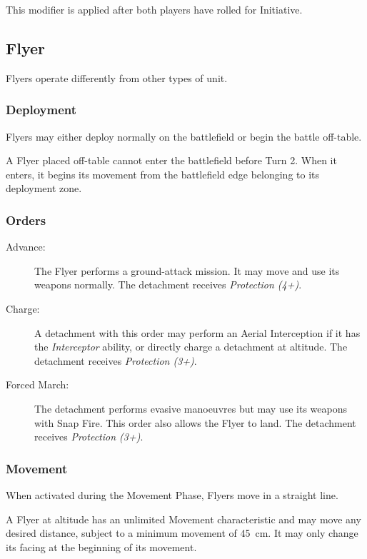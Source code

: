 This modifier is applied after both players have rolled for Initiative.

\subsection{Flyer}

Flyers operate differently from other types of unit.

\subsubsection{Deployment}

Flyers may either deploy normally on the battlefield or begin the battle off-table.

A Flyer placed off-table cannot enter the battlefield before Turn 2. When it enters, it begins its movement from the battlefield edge belonging to its deployment zone.

\subsubsection{Orders}

\begin{description}
    \item[Advance:] The Flyer performs a ground-attack mission. It may move and use its weapons normally. The detachment receives \textit{Protection (4+)}.

    \item[Charge:] A detachment with this order may perform an Aerial Interception if it has the \textit{Interceptor} ability, or directly charge a detachment at altitude. The detachment receives \textit{Protection (3+)}.

    \item[Forced March:] The detachment performs evasive manoeuvres but may use its weapons with Snap Fire. This order also allows the Flyer to land. The detachment receives \textit{Protection (3+)}.
\end{description}

\subsubsection{Movement}

When activated during the Movement Phase, Flyers move in a straight line.

A Flyer at altitude has an unlimited Movement characteristic and may move any desired distance, subject to a minimum movement of 45~cm. It may only change its facing at the beginning of its movement.

